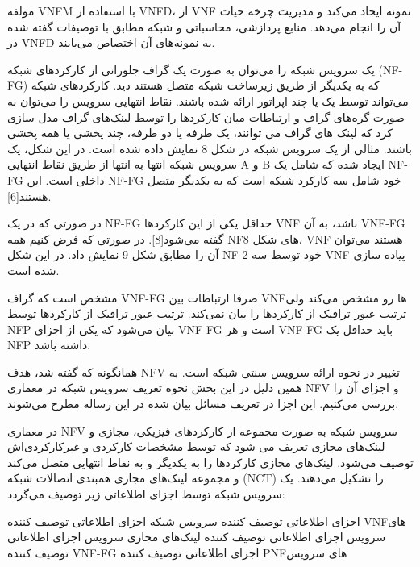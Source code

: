 
مولفه VNFM با استفاده از VNFD، از VNF نمونه ایجاد می‌کند و مدیریت چرخه حیات آن را انجام می‌دهد.
منابع پردازشی، محاسباتی و شبکه مطابق با توصیفات گفته شده در VNFD به نمونه‌های آن اختصاص می‌یابند.


یک سرویس شبکه را می‌توان به صورت یک گراف جلورانی از کارکردهای شبکه (NF-FG) که به یکدیگر از طریق زیرساخت شبکه متصل هستند دید.
کارکردهای شبکه می‌تواند توسط یک یا چند اپراتور ارائه شده باشند. نقاط انتهایی سرویس را می‌توان به صورت گره‌های گراف و ارتباطات
میان کارکردها را توسط لینک‌های گراف مدل سازی کرد که لینک های گراف می توانند، یک طرفه یا دو طرفه، چند پخشی یا همه پخشی باشند. مثالی از یک سرویس شبکه در شکل 8 نمایش داده شده است. در این شکل، یک سرویس شبکه انتها به انتها از طریق نقاط انتهایی A و B ایجاد شده که شامل یک NF-FG داخلی است. این NF-FG خود شامل سه کارکرد شبکه است که به یکدیگر متصل هستند[6].

در صورتی که در یک NF-FG حداقل یکی از این کارکردها VNF باشد، به آن VNF-FG گفته می‌شود[8].
در صورتی که فرض کنیم همه NFهای شکل 8، VNF هستند می‌توان آن را مطابق شکل 9 نمایش داد. در این شکل NF 2 خود توسط سه VNF پیاده سازی شده است.

مشخص است که گراف VNF-FG صرفا ارتباطات بین VNFها رو مشخص می‌کند ولی ترتیب عبور ترافیک از کارکردها را بیان نمی‌کند.
ترتیب عبور ترافیک از کارکردها توسط NFP بیان می‌شود که یکی از اجزای VNF-FG است و هر VNF-FG باید حداقل یک NFP داشته باشد.

همانگونه که گفته شد، هدف NFV تغییر در نحوه ارائه سرویس سنتی شبکه است.
به همین دلیل در این بخش نحوه تعریف سرویس شبکه در معماری NFV و اجزای آن را بررسی می‌کنیم. این اجزا در تعریف مسائل بیان شده در این رساله مطرح می‌شوند.


در معماری NFV سرویس شبکه به صورت مجموعه از کارکردهای فیزیکی، مجازی و لینک‌های مجازی تعریف می شود که توسط مشخصات کارکردی و غیرکارکردی‌اش توصیف می‌شود.
لینک‌های مجازی کارکردها را به یکدیگر و به نقاط انتهایی متصل می‌کند و مجموعه لینک‌های مجازی همبندی اتصالات شبکه
(NCT) را تشکیل می‌دهند. یک سرویس شبکه توسط اجزای اطلاعاتی زیر توصیف می‌گردد:

 اجزای اطلاعاتی توصیف کننده سرویس شبکه
 اجزای اطلاعاتی توصیف کننده VNFهای سرویس
 اجزای اطلاعاتی توصیف کننده لینک‌های مجازی سرویس
 اجزای اطلاعاتی توصیف کننده VNF-FG
 اجزای اطلاعاتی توصیف کننده PNFهای سرویس

